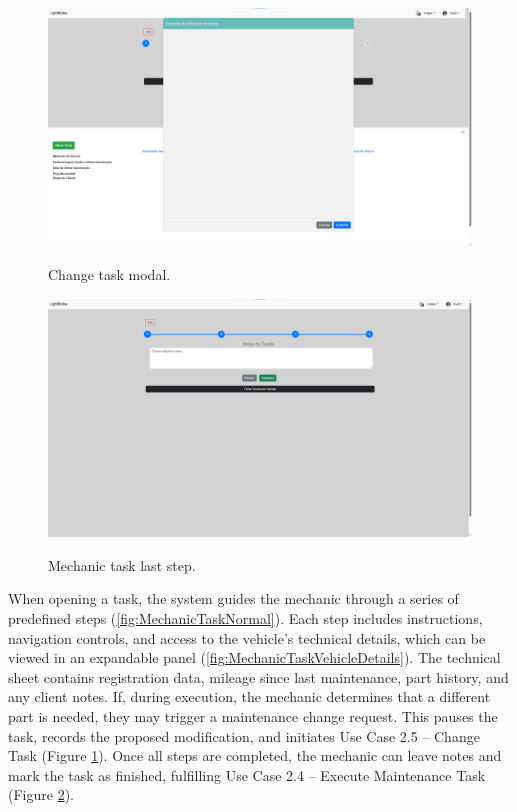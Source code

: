 \begin{figure}[h]
  \caption{Change task modal.}
  \centering
  \includegraphics[width=\textwidth]{figs/Implementation/mechanic/MechanicTaskChangeTask}
  \label{fig:MechanicTaskChangeTask}
\end{figure}


\begin{figure}[h]
  \caption{Mechanic task last step.}
  \centering
  \includegraphics[width=\textwidth]{figs/Implementation/mechanic/MechanicTaskLastStep}
  \label{fig:MechanicTaskLastStep}
\end{figure}


When opening a task, the system guides the mechanic through a series of predefined steps (\ref{fig:MechanicTaskNormal}). Each step includes instructions, navigation controls, and access to the vehicle's technical details, which can be viewed in an expandable panel (\ref{fig:MechanicTaskVehicleDetails}). The technical sheet contains registration data, mileage since last maintenance, part history, and any client notes. If, during execution, the mechanic determines that a different part is needed, they may trigger a maintenance change request. This pauses the task, records the proposed modification, and initiates Use Case 2.5 – Change Task (Figure \ref{fig:MechanicTaskChangeTask}). Once all steps are completed, the mechanic can leave notes and mark the task as finished, fulfilling Use Case 2.4 – Execute Maintenance Task (Figure \ref{fig:MechanicTaskLastStep}).




